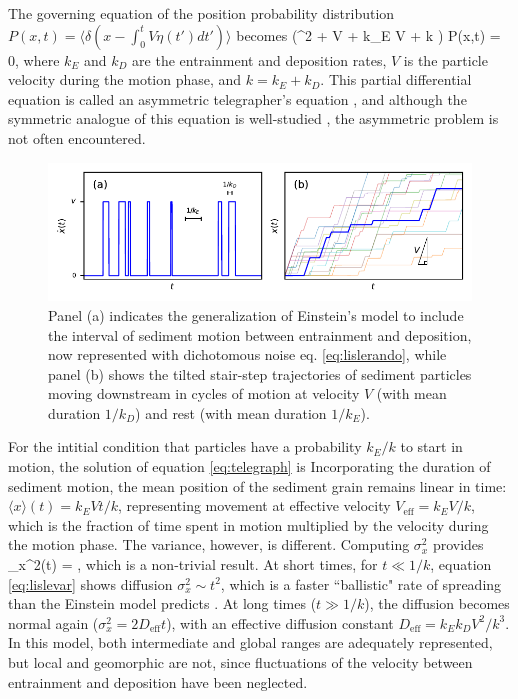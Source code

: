 The governing equation of the position probability distribution $P(x,t) = \langle \delta(x-\int_0^t V\eta(t')dt') \rangle$ becomes \citep{Balakrishnan1993}
\be \big(\pt^2 + V \px \pt + k_E V \px + k \pt \big) P(x,t) = 0,\ee
where $k_E$ and $k_D$ are the entrainment and deposition rates, $V$ is the particle velocity during the motion phase, and $k = k_E+k_D$. This partial differential equation is called an asymmetric telegrapher's equation \citep{Rossetto2018}, and although the symmetric analogue of this equation is well-studied \citep{Weiss2002a, Masoliver2017}, the asymmetric problem is not often encountered.
\begin{figure}[!htbp]
	\includegraphics[width=\linewidth,keepaspectratio]{./figures/ch1/lisleConcept.pdf}
	\caption{Panel (a) indicates the generalization of Einstein's model to include the interval of sediment motion between entrainment and deposition, now represented with dichotomous noise eq. \ref{eq:lislerando}, while panel (b) shows the tilted stair-step trajectories of sediment particles moving downstream in cycles of motion at velocity $V$ (with mean duration $1/k_D$) and rest (with mean duration $1/k_E$). }
	\label{fig:lislefig}
\end{figure}

For the intitial condition that particles have a probability $k_E/k$ to start in motion, the solution of equation \ref{eq:telegraph} is \citep{Lisle1998}
\be \ee
Incorporating the duration of sediment motion, the mean position of the sediment grain remains linear in time: $\langle x \rangle (t) = k_E V t/k$, representing movement at effective velocity $V_\text{eff} = k_E V/k$, which is the fraction of time spent in motion multiplied by the velocity during the motion phase. The variance, however, is different.
Computing $\sigma_x^2$ provides
\be \sigma_x^2(t) = ,\ee
which is a non-trivial result. At short times, for $t\ll 1/k$, equation \ref{eq:lislevar} shows diffusion $\sigma_x^2 \sim t^2$, which is a faster ``ballistic" rate of spreading than the Einstein model predicts \citep{Sokolov2014}. At long times ($t\gg 1/k$), the diffusion becomes normal again ($\sigma_x^2 = 2 D_\text{eff} t$), with an effective diffusion constant $ D_\text{eff} = k_E k_D V^2/k^3$.
In this model, both intermediate and global ranges are adequately represented, but local and geomorphic are not, since fluctuations of the velocity between entrainment and deposition have been neglected.

